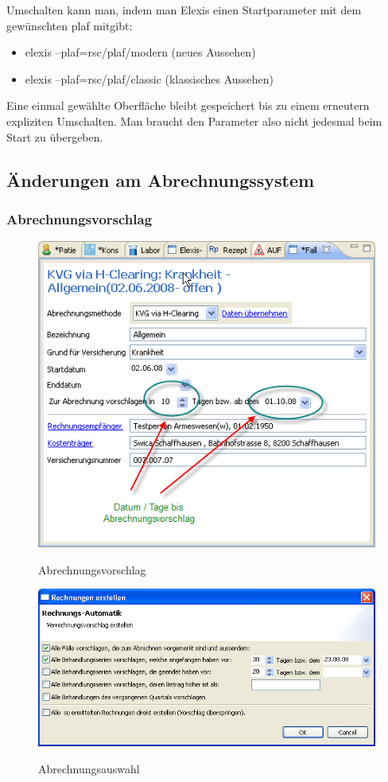 \documentclass[a4paper]{scrartcl}
\begin{document}
\bigskip
Umschalten kann man, indem man Elexis einen Startparameter mit dem gewünschten plaf mitgibt:

\begin{itemize}
\item elexis --plaf=rsc/plaf/modern  (neues Aussehen)
\item elexis --plaf=rsc/plaf/classic (klassisches Aussehen)
\end{itemize}

Eine einmal gewählte Oberfläche bleibt gespeichert bis zu einem erneutern expliziten Umschalten. Man braucht den Parameter also nicht jedesmal beim Start zu übergeben.

\subsection{Änderungen am Abrechnungssystem}
\subsubsection{Abrechnungsvorschlag}
\begin{figure}
  \includegraphics{abrvor1}\\
  \caption{Abrechnungsvorschlag}\label{fig:abrvor1}
\end{figure}

\begin{figure}
  \includegraphics{abrvor2}\\
  \caption{Abrechnungsauswahl}\label{fig:abrvor2}
\end{figure}
\end{document}
